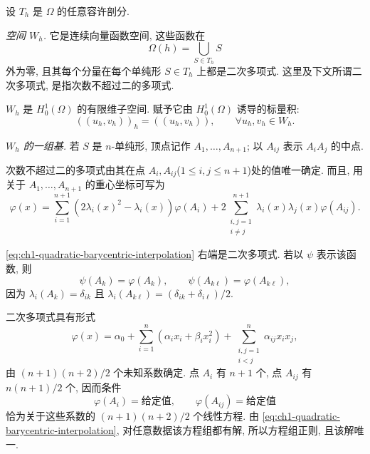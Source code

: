 设 $T_h$ 是 $\Omega$ 的任意容许剖分.

\emph{空间 $W_h$.} 它是连续向量函数空间, 这些函数在
\begin{equation}
\Omega(h)=\bigcup_{S\in T_h}S
\label{eq:ch1-degree-two-domain}
\end{equation}
外为零, 且其每个分量在每个单纯形 $S\in T_h$ 上都是二次多项式. 这里及下文所谓二次多项式, 是指次数不超过二的多项式.

$W_h$ 是 $H_0^1(\Omega)$ 的有限维子空间. 赋予它由 $H_0^1(\Omega)$ 诱导的标量积:
\begin{equation}
((u_h,v_h))_h=((u_h,v_h)),
\qquad\forall u_h,v_h\in W_h.
\label{eq:ch1-degree-two-h01-product}
\end{equation}

\emph{$W_h$ 的一组基.} 若 $S$ 是 $n$-单纯形, 顶点记作 $A_1,\ldots,A_{n+1}$; 以 $A_{ij}$ 表示 $A_iA_j$ 的中点.

\begin{Lemma}
\label{lem:ch1-quadratic-simplex-interpolation}
次数不超过二的多项式由其在点 $A_i,A_{ij}$($1\leq i,j\leq n+1$)处的值唯一确定. 而且, 用关于 $A_1,\ldots,A_{n+1}$ 的重心坐标可写为
\begin{equation}
\varphi(x)
=\sum_{i=1}^{n+1}\left(2\lambda_i(x)^2-\lambda_i(x)\right)\varphi(A_i)
+2\sum_{\substack{i,j=1\\i\neq j}}^{n+1}
\lambda_i(x)\lambda_j(x)\varphi(A_{ij}).
\label{eq:ch1-quadratic-barycentric-interpolation}
\end{equation}
\end{Lemma}

\begin{Proof}
\eqref{eq:ch1-quadratic-barycentric-interpolation} 右端是二次多项式. 若以 $\psi$ 表示该函数, 则
\[
\psi(A_k)=\varphi(A_k),\qquad
\psi(A_{k\ell})=\varphi(A_{k\ell}),
\]
因为 $\lambda_i(A_k)=\delta_{ik}$ 且
$\lambda_i(A_{k\ell})=(\delta_{ik}+\delta_{i\ell})/2$.

二次多项式具有形式
\begin{equation}
\varphi(x)=\alpha_0+\sum_{i=1}^n(\alpha_ix_i+\beta_ix_i^2)
+\sum_{\substack{i,j=1\\i<j}}^n\alpha_{ij}x_ix_j,
\label{eq:ch1-general-quadratic-polynomial}
\end{equation}
由 $(n+1)(n+2)/2$ 个未知系数确定. 点 $A_i$ 有 $n+1$ 个, 点 $A_{ij}$ 有 $n(n+1)/2$ 个, 因而条件
\begin{equation}
\varphi(A_i)=\text{给定值},\qquad
\varphi(A_{ij})=\text{给定值}
\label{eq:ch1-quadratic-interpolation-data}
\end{equation}
恰为关于这些系数的 $(n+1)(n+2)/2$ 个线性方程. 由 \eqref{eq:ch1-quadratic-barycentric-interpolation}, 对任意数据该方程组都有解, 所以方程组正则, 且该解唯一.
\end{Proof}

